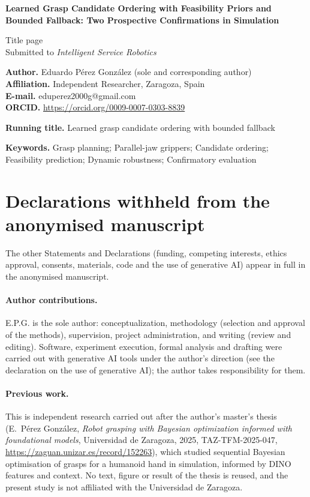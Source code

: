 \documentclass[11pt,a4paper]{article}
\begin{document}
\pagestyle{empty}

\begin{center}
{\Large\bfseries Learned Grasp Candidate Ordering with Feasibility Priors and Bounded Fallback: Two Prospective Confirmations in Simulation\par}
\bigskip
{\large Title page}\\[2pt]
Submitted to \emph{Intelligent Service Robotics}
\end{center}

\bigskip
\noindent\textbf{Author.} Eduardo P\'erez Gonz\'alez (sole and corresponding author)\\
\textbf{Affiliation.} Independent Researcher, Zaragoza, Spain\\
\textbf{E-mail.} eduperez2000g@gmail.com\\
\textbf{ORCID.} \url{https://orcid.org/0009-0007-0303-8839}

\medskip
\noindent\textbf{Running title.} Learned grasp candidate ordering with bounded fallback

\medskip
\noindent\textbf{Keywords.} Grasp planning; Parallel-jaw grippers; Candidate ordering; Feasibility prediction; Dynamic robustness; Confirmatory evaluation

\section*{Declarations withheld from the anonymised manuscript}

\noindent The other Statements and Declarations (funding, competing interests, ethics approval, consents, materials, code and the use of generative AI) appear in full in the anonymised manuscript.

\paragraph{Author contributions.} E.P.G. is the sole author: conceptualization, methodology (selection and approval of the methods), supervision, project administration, and writing (review and editing). Software, experiment execution, formal analysis and drafting were carried out with generative AI tools under the author's direction (see the declaration on the use of generative AI); the author takes responsibility for them.

\paragraph{Previous work.} This is independent research carried out after the author's master's thesis (E.~P\'erez Gonz\'alez, \emph{Robot grasping with Bayesian optimization informed with foundational models}, Universidad de Zaragoza, 2025, TAZ-TFM-2025-047, \url{https://zaguan.unizar.es/record/152263}), which studied sequential Bayesian optimisation of grasps for a humanoid hand in simulation, informed by DINO features and context. No text, figure or result of the thesis is reused, and the present study is not affiliated with the Universidad de Zaragoza.
\end{document}

